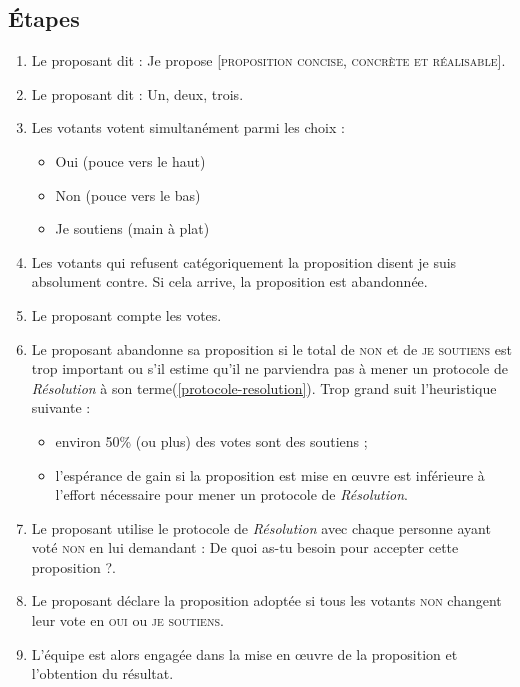 \documentclass[11pt]{book}
\newcommand*{\numref}[1]{{\hyperref[{#1}]{\autoref*{#1}}}}
\begin{document}
\subsection{Étapes}
\begin{enumerate}
	\item Le proposant dit : \og{}Je propose [\textsc{proposition concise, concrète et réalisable}]\fg{}.
	\item Le proposant dit : \og{}Un, deux, trois\fg{}.
	\item Les votants votent simultanément parmi les choix :
	      \begin{itemize}
	      	\item Oui (pouce vers le haut)
	      	\item Non (pouce vers le bas)
	      	\item Je soutiens (main à plat)
	      \end{itemize}
	\item Les votants qui refusent catégoriquement la proposition disent \og{}je suis absolument contre\fg{}. Si cela arrive, la proposition est abandonnée.
	\item Le proposant compte les votes.
	\item Le proposant abandonne sa proposition si le total de \textsc{non} et de \textsc{je soutiens} est trop important ou s'il estime qu'il ne parviendra
	      pas à mener un protocole de \emph{Résolution} à son terme(\numref{protocole-resolution}). \og{}Trop grand\fg{} suit l'heuristique suivante :
	      \begin{itemize}
	      	\item environ 50\% (ou plus) des votes sont des soutiens ;
	      	\item l'espérance de gain si la proposition est mise en œuvre est inférieure à l'effort nécessaire pour mener un protocole de \emph{Résolution}.
	      \end{itemize}
	\item Le proposant utilise le protocole de \emph{Résolution} avec chaque personne ayant voté \textsc{non} en lui demandant : \og{}De quoi as-tu besoin pour
	      accepter cette proposition ?\fg{}.
	\item Le proposant déclare la proposition adoptée si tous les votants \textsc{non} changent leur vote en \textsc{oui} ou \textsc{je soutiens}.
	\item L'équipe est alors engagée dans la mise en œuvre de la proposition et l'obtention du résultat.
\end{enumerate}
\end{document}

